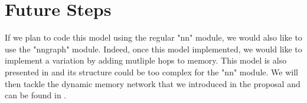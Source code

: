 \documentclass[paper=a4, fontsize=11pt]{scrartcl} %
\numberwithin{equation}{section} %
\numberwithin{figure}{section} %
\numberwithin{table}{section} %
\begin{document}
\section{Future Steps}

If we plan to code this model using the regular "nn" module, we would also like to use the "nngraph" module. Indeed, once this model implemented, we would like to implement a variation by adding mutliple hops to memory. This model is also presented in \cite{mem} and its structure could be too complex for the "nn" module. We will then tackle the dynamic memory network that we introduced in the proposal and can be found in \cite{dmn}.


\end{document}
